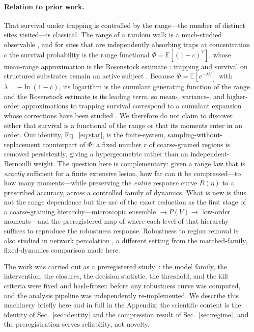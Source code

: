 \documentclass[aps,pre,twocolumn,superscriptaddress,floatfix,longbibliography]{revtex4-2}
\begin{document}
\paragraph{Relation to prior work.}
That survival under trapping is controlled by the range---the number of distinct
sites visited---is classical. The range of a random walk is a much-studied
observable \cite{DonskerVaradhan1979,Weiss1994}, and for sites that are independently
absorbing traps at concentration $c$ the survival probability is the range
functional $\Phi=\mathbb{E}[(1-c)^{V}]$, whose mean-range approximation is the
Rosenstock estimate \cite{Rosenstock1970}; trapping and survival on structured
substrates remain an active subject \cite{Gallos2004}. Because
$\Phi=\mathbb{E}[e^{-\lambda V}]$ with $\lambda=-\ln(1-c)$, its logarithm is the
cumulant generating function of the range and the Rosenstock estimate is its leading
term, so mean-, variance-, and higher-order approximations to trapping survival
correspond to a cumulant expansion whose corrections have been studied
\cite{Weiss1994,Gallos2004}. We therefore do not claim to discover either that
survival is a functional of the range or that its moments enter in an order. Our
identity, Eq.~\eqref{eq:star}, is the finite-system, sampling-without-replacement
counterpart of $\Phi$: a fixed number $r$ of coarse-grained regions is removed
persistently, giving a hypergeometric rather than an independent-Bernoulli weight.
The question here is complementary: given a range law that is \emph{exactly}
sufficient for a finite extensive lesion, how far can it be compressed---to how many
moments---while preserving the \emph{entire} response curve $R(\eta)$ to a
prescribed accuracy, across a controlled family of dynamics. What is new is thus not
the range dependence but the use of the exact reduction as the first stage of a
coarse-graining hierarchy---microscopic ensemble $\to P(V)\to$ low-order
moments---and the preregistered map of where each level of that hierarchy suffices to
reproduce the robustness response. Robustness to region removal is also studied in
network percolation \cite{Albert2000}, a different setting from the matched-family,
fixed-dynamics comparison made here.

The work was carried out as a preregistered study~\cite{Nosek2018}: the model family, the
intervention, the closures, the decision statistic, the threshold, and the kill
criteria were fixed and hash-frozen before any robustness curve was computed, and
the analysis pipeline was independently re-implemented. We describe this machinery
briefly here and in full in the Appendix; the scientific content is the identity of
Sec.~\ref{sec:identity} and the compression result of Sec.~\ref{sec:regime}, and
the preregistration serves reliability, not novelty.
\end{document}
